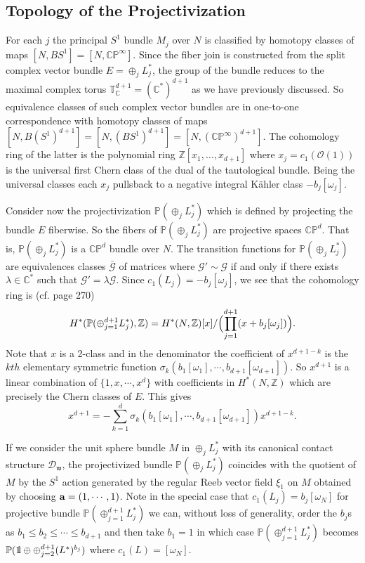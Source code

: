 \documentclass[12pt]{amsart}
\def\BOne{{\mathchoice {\rm 1\mskip-4mu l} {\rm 1\mskip-4mu l}
                          {\rm 1\mskip-4.5mu l} {\rm 1\mskip-5mu l}}}
\def\bbc{{\mathbb C}}
\def\bbp{{\mathbb P}}
\def\bbt{{\mathbb T}}
\def\bbz{{\mathbb Z}}
\def\grl{\lambda}
\def\gro{\omega}
\def\grs{\sigma}
\def\bfa{{\bf a}}
\def\calo{{\mathcal O}}
\def\cald{{\mathcal D}}
\def\calg{{\mathcal G}}
\def\calo{{\mathcal O}}
\def\gw{{\mathfrak w}}
\begin{document}
\subsection{Topology of the Projectivization}
For each $j$ the principal $S^1$ bundle $M_j$ over $N$ is classified by homotopy classes of maps $[N,BS^1]=[N,\bbc\bbp^\infty]$. Since the fiber join is constructed from the split complex vector bundle $E=\oplus_{j}L^*_j$, the group of the bundle reduces to the maximal complex torus $\bbt^{d+1}_\bbc=(\bbc^*)^{d+1}$ as we have previously discussed. So equivalence classes of such complex vector bundles are in one-to-one correspondence with homotopy classes of maps $[N,B(S^1)^{d+1}]=[N,(BS^1)^{d+1}]=[N,(\bbc\bbp^\infty)^{d+1}]$. The cohomology ring of the latter is the polynomial ring $\bbz[x_1,\ldots,x_{d+1}]$ where $x_j=c_1(\calo(1))$ is the universal first Chern class of the dual of the tautological bundle. Being the universal classes each $x_j$ pullsback to a negative integral K\"ahler class $-b_j[\gro_j]$.


Consider now the projectivization $\bbp(\oplus_jL^*_j)$ which is defined by projecting the bundle $E$ fiberwise. So the fibers of $\bbp(\oplus_{j}L^*_j)$ are projective spaces $\bbc\bbp^d$. That is, $\bbp(\oplus_{j}L^*_j)$ is a $\bbc\bbp^d$ bundle over $N$. The transition functions for $\bbp(\oplus_{j}L^*_j)$ are equivalences classes $\bar{\calg}$ of matrices where $\calg'\sim \calg$ if and only if there exists $\grl\in\bbc^*$ such that $\calg'=\grl\calg$. Since $c_1(L_j)=-b_j[\gro_j]$, we see that the cohomology ring is (cf. \cite{BoTu82} page 270) 
$$H^*(\bbp(\oplus_{j=1}^{d+1}L^*_j),\bbz)=H^*(N,\bbz)[x]/\Bigl(\prod_{j=1}^{d+1}(x+b_j[\gro_j])\Bigr).$$ 
Note that $x$ is a 2-class and in the denominator the coefficient of $x^{d+1-k}$ is the $kth$ elementary symmetric function $\grs_k(b_1[\gro_1],\cdots,b_{d+1}[\gro_{d+1}])$. 
So $x^{d+1}$ is a linear combination of $\{1,x,\cdots,x^d\}$ with coefficients in $H^*(N,\bbz)$ which are precisely the Chern classes of $E$. This gives
$$x^{d+1}=-\sum_{k=1}^d\grs_k(b_1[\gro_1],\cdots,b_{d+1}[\gro_{d+1}])x^{d+1-k}.$$


If we consider the unit sphere bundle $M$ in $\oplus_jL^*_j$ with its canonical contact structure $\cald_\gw$, the projectivized bundle $\bbp(\oplus_jL^*_j)$ coincides with the quotient of $M$ by the $S^1$ action generated by the regular Reeb vector field $\xi_1$ on $M$ obtained by choosing $\bfa=(1,\cdots,1)$.  Note in the special case that $c_1(L_j)=b_j[\gro_N]$ for projective bundle $\bbp(\oplus_{j=1}^{d+1}L^*_j)$ we can, without loss of generality,  order the $b_j$s as $b_1\leq b_2\leq \cdots\leq b_{d+1}$ and then take $b_1=1$ in which case $\bbp(\oplus_{j=1}^{d+1}L^*_j)$ becomes $\bbp(\BOne\oplus \oplus_{j=2}^{d+1}(L^*)^{b_j})$ where $c_1(L)=[\gro_N]$.
\end{document}
